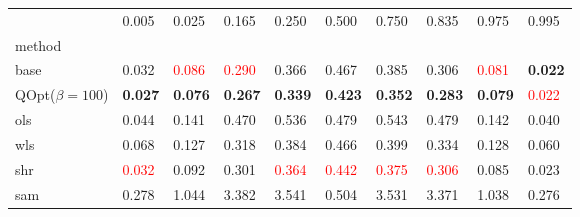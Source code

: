 \begin{tabular}{llllllllll}
\toprule
 & 0.005 & 0.025 & 0.165 & 0.250 & 0.500 & 0.750 & 0.835 & 0.975 & 0.995 \\
method &  &  &  &  &  &  &  &  &  \\
\midrule
base & 0.032 & \textcolor{red}{0.086} & \textcolor{red}{0.290} & 0.366 & 0.467 & 0.385 & 0.306 & \textcolor{red}{0.081} & \textbf{0.022} \\
\midrule
QOpt($\beta=100$) & \textbf{0.027} & \textbf{0.076} & \textbf{0.267} & \textbf{0.339} & \textbf{0.423} & \textbf{0.352} & \textbf{0.283} & \textbf{0.079} & \textcolor{red}{0.022} \\
ols & 0.044 & 0.141 & 0.470 & 0.536 & 0.479 & 0.543 & 0.479 & 0.142 & 0.040 \\
wls & 0.068 & 0.127 & 0.318 & 0.384 & 0.466 & 0.399 & 0.334 & 0.128 & 0.060 \\
shr & \textcolor{red}{0.032} & 0.092 & 0.301 & \textcolor{red}{0.364} & \textcolor{red}{0.442} & \textcolor{red}{0.375} & \textcolor{red}{0.306} & 0.085 & 0.023 \\
sam & 0.278 & 1.044 & 3.382 & 3.541 & 0.504 & 3.531 & 3.371 & 1.038 & 0.276 \\
\bottomrule
\end{tabular}